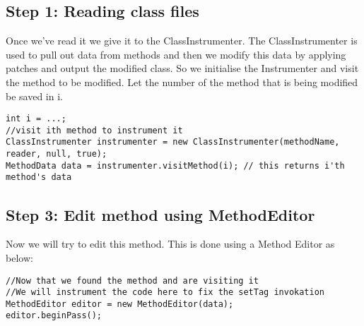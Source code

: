 \documentclass[11pt,psfig,a4]{article}
\begin{document}
\begin{flushleft}
\subsection{Step 1: Reading class files}
Once we've read it we give it to the ClassInstrumenter. The ClassInstrumenter is used to pull out data from methods and then we modify this data by applying patches and output the modified class. So we initialise the Instrumenter and visit the method to be modified. Let the number of the method that is being modified be saved in i.\\
\begin{lstlisting}
int i = ...;
//visit ith method to instrument it
ClassInstrumenter instrumenter = new ClassInstrumenter(methodName, reader, null, true);
MethodData data = instrumenter.visitMethod(i); // this returns i'th method's data
\end{lstlisting}
\subsection{Step 3: Edit method using MethodEditor}
Now we will try to edit this method. This is done using a Method Editor as below:\\
\begin{lstlisting}
//Now that we found the method and are visiting it
//We will instrument the code here to fix the setTag invokation
MethodEditor editor = new MethodEditor(data); 
editor.beginPass();
\end{lstlisting}

\end{flushleft}
\end{document}
